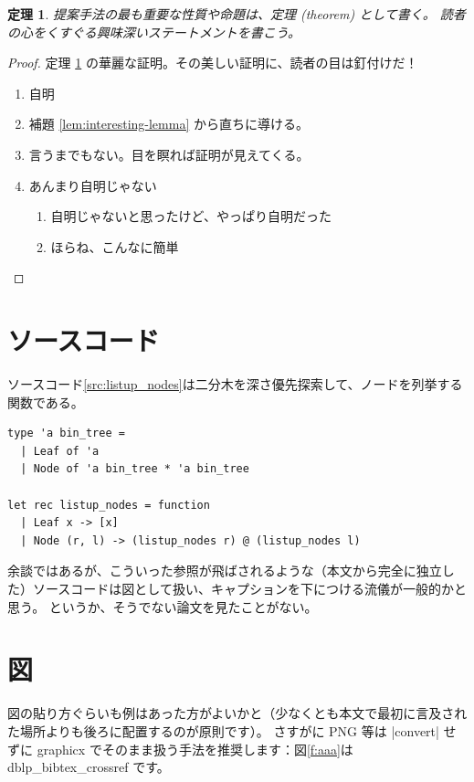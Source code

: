 \documentclass[uplatex]{sumiilab-paper}
\theoremstyle{mystyle}
\newtheorem{theorem}[definition]{定理}
\numberwithin{definition}{chapter} %
\begin{document}
\begin{theorem}
  \label{thm:wonderful-theorem}
  提案手法の最も重要な性質や命題は、定理 (theorem) として書く。
  読者の心をくすぐる興味深いステートメントを書こう。
\end{theorem}

\begin{proof}
  定理 \ref{thm:wonderful-theorem} の華麗な証明。その美しい証明に、読者の目は釘付けだ！
  \begin{enumerate}[leftmargin=0pt,itemindent=*,label=Case \arabic*.]
  \item 自明
  \item 補題 \ref{lem:interesting-lemma} から直ちに導ける。
  \item 言うまでもない。目を瞑れば証明が見えてくる。
  \item あんまり自明じゃない
    \begin{enumerate}[label=(\roman*)]
    \item 自明じゃないと思ったけど、やっぱり自明だった
    \item ほらね、こんなに簡単
    \end{enumerate}
  \end{enumerate}
\end{proof}

\section{ソースコード}

ソースコード\ref{src:listup_nodes}は二分木を深さ優先探索して、ノードを列挙する関数である。
\begin{lstlisting}[caption=二分木のノードのリストアップ,label=src:listup_nodes]
type 'a bin_tree =
  | Leaf of 'a
  | Node of 'a bin_tree * 'a bin_tree

let rec listup_nodes = function
  | Leaf x -> [x]
  | Node (r, l) -> (listup_nodes r) @ (listup_nodes l)
\end{lstlisting}

余談ではあるが、こういった参照が飛ばされるような（本文から完全に独立した）ソースコードは図として扱い、キャプションを下につける流儀が一般的かと思う。
というか、そうでない論文を見たことがない。


\section{図}

図の貼り方ぐらいも例はあった方がよいかと（少なくとも本文で最初に言及された場所よりも後ろに配置するのが原則です）。
さすがに PNG 等は |convert| せずに graphicx でそのまま扱う手法を推奨します：図\ref{f:aaa}は dblp\_bibtex\_crossref です。
\end{document}
